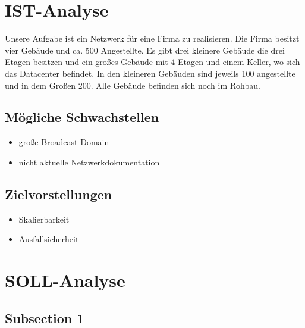 \documentclass[a4paper,11pt]{article}
\begin{document}
\section{IST-Analyse}
Unsere Aufgabe ist ein Netzwerk für eine Firma zu realisieren. Die Firma besitzt vier Gebäude und ca. 500 Angestellte. Es gibt drei kleinere Gebäude die drei Etagen besitzen und ein großes Gebäude mit 4 Etagen und einem Keller, wo sich das Datacenter befindet. In den kleineren Gebäuden sind jeweils 100 angestellte und in dem Großen 200. Alle Gebäude befinden sich noch im Rohbau. 
\\
\subsection{Mögliche Schwachstellen}
    \begin{itemize}
        \item große Broadcast-Domain
        \item nicht aktuelle Netzwerkdokumentation
        \\
    \end{itemize}

\subsection{Zielvorstellungen}
    \begin{itemize}
        \item Skalierbarkeit
        \item Ausfallsicherheit
        \\
    \end{itemize}




\section{SOLL-Analyse}
\subsection{Subsection 1}
\end{document}

